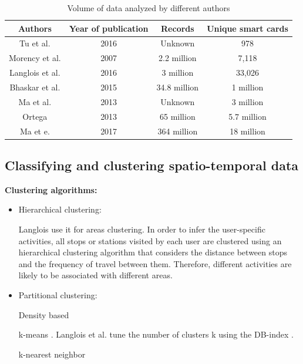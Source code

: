 \documentclass{article}
\begin{document}
\begin{table}[h!]
\centering
\begin{tabular}{||c c c c||} 
 \hline
 Authors & Year of publication & Records & Unique smart cards \\ [0.5ex] 
 \hline\hline
 Tu et al. \cite{tu2016impact} & 2016 & Unknown & 978 \\ 
 Morency et al. \cite{morency2007measuring} & 2007 & 2.2 million & 7,118 \\
 Langlois et al. \cite{langlois2016inferring} & 2016 & 3 million & 33,026 \\
 Bhaskar et al. \cite{bhaskar2015passenger} & 2015 & 34.8 million & 1 million\\
 Ma et al. \cite{ma2013mining} & 2013 & Unknown & 3 million \\
 Ortega \cite{ortega2013classification} & 2013 & 65 million & 5.7 million\\
 Ma et e. \cite{ma2017understanding} & 2017 & 364 million & 18 million \\ [1ex] 
 \hline
\end{tabular}
\caption{Volume of data analyzed by different authors}
\label{table:volumeData}
\end{table}


\subsection{Classifying and clustering spatio-temporal data}
\textbf{Clustering algorithms:} 

\begin{itemize}
\item Hierarchical clustering: 

Langlois use it for areas clustering. In order to infer the user-specific activities, all stops or stations visited by each user are clustered using an hierarchical clustering algorithm that considers the distance between stops and the frequency of travel between them. Therefore, different activities are likely to be associated with different areas.  \cite{langlois2016inferring}

\item Partitional clustering:


Density based \cite{bhaskar2015passenger}

k-means \cite{morency2007measuring}. Langlois et al. tune the number of clusters k using the DB-index \cite{langlois2016inferring}. 

k-nearest neighbor \cite{ortega2013classification}


\end{itemize}
\end{document}
